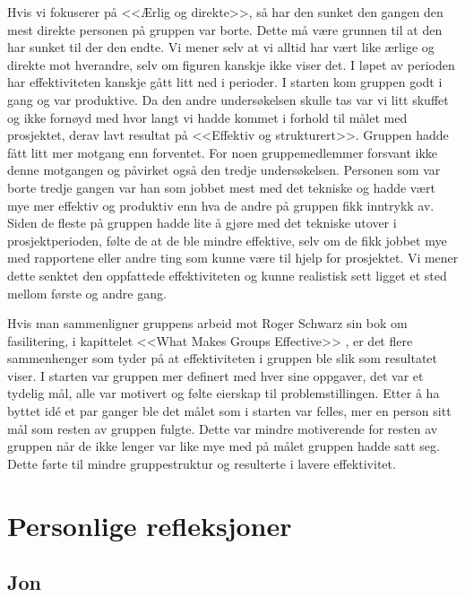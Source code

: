 Hvis vi fokuserer på <<Ærlig og direkte>>, så har den sunket den gangen den mest direkte personen på gruppen var borte. Dette må være grunnen til at den har sunket til der den endte. Vi mener selv at vi alltid har vært like ærlige og direkte mot hverandre, selv om figuren kanskje ikke viser det. I løpet av perioden har effektiviteten kanskje gått litt ned i perioder. I starten kom gruppen godt i gang og var produktive. Da den andre undersøkelsen skulle tas var vi litt skuffet og ikke fornøyd med hvor langt vi hadde kommet i forhold til målet med prosjektet, derav lavt resultat på <<Effektiv og strukturert>>. Gruppen hadde fått litt mer motgang enn forventet. For noen gruppemedlemmer forsvant ikke denne motgangen og påvirket også den tredje undersøkelsen. Personen som var borte tredje gangen var han som jobbet mest med det tekniske og hadde vært mye mer effektiv og produktiv enn hva de andre på gruppen fikk inntrykk av. Siden de fleste på gruppen hadde lite å gjøre med det tekniske utover i prosjektperioden, følte de at de ble mindre effektive, selv om de fikk jobbet mye med rapportene eller andre ting som kunne være til hjelp for prosjektet. Vi mener dette senktet den oppfattede effektiviteten og kunne realistisk sett ligget et sted mellom første og andre gang. 

Hvis man sammenligner gruppens arbeid mot Roger Schwarz sin bok om fasilitering, i kapittelet <<What Makes Groups Effective>> \cite[s. 17-34]{schwarz_skilled_2002}, er det flere sammenhenger som tyder på at effektiviteten i gruppen ble slik som resultatet viser. I starten var gruppen mer definert med hver sine oppgaver, det var et tydelig mål, alle var motivert og følte eierskap til problemstillingen. Etter å ha byttet idé et par ganger ble det målet som i starten var felles, mer en person sitt mål som resten av gruppen fulgte. Dette var mindre motiverende for resten av gruppen når de ikke lenger var like mye med på målet gruppen hadde satt seg. Dette førte til mindre gruppestruktur og resulterte i lavere effektivitet. 

\section{Personlige refleksjoner}
\subsection{Jon}

